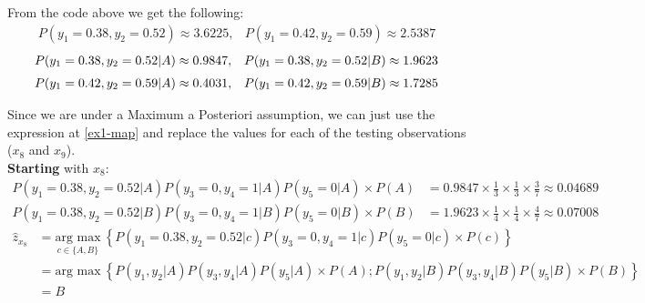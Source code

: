 \documentclass[12pt]{article}
\begin{document}
\begin{enumerate}[leftmargin=\labelsep]
\begin{enumerate}
                

                From the code above we get the following:
                \[
                  \begin{array}{cc}
                    P(y_1 = 0.38, y_2 = 0.52) \approx 3.6225, &
                    P(y_1 = 0.42, y_2 = 0.59) \approx 2.5387
                  \end{array}
                \]
                \[
                  \begin{array}{cc}
                    P(y_1 = 0.38, y_2 = 0.52 | A) \approx 0.9847, &
                    P(y_1 = 0.38, y_2 = 0.52 | B) \approx 1.9623    \\[\medskipamount]
                    P(y_1 = 0.42, y_2 = 0.59 | A) \approx 0.4031, &
                    P(y_1 = 0.42, y_2 = 0.59 | B) \approx 1.7285
                  \end{array}
                \]

                Since we are under a Maximum a Posteriori assumption, we can just use the expression at \eqref{ex1-map}
                and replace the values for each of the testing observations ($x_8$ and $x_9$).\\
                \textbf{Starting} with $x_8$:
                $$
                  \begin{aligned}
                    P(y_1 = 0.38, y_2 = 0.52 | A) P(y_3 = 0, y_4 = 1 | A) P(y_5 = 0 | A) \times P(A) & = 0.9847 \times \frac{1}{3} \times \frac{1}{3} \times \frac{3}{7} \approx 0.04689 \\
                    P(y_1 = 0.38, y_2 = 0.52 | B) P(y_3 = 0, y_4 = 1 | B) P(y_5 = 0 | B) \times P(B) & = 1.9623 \times \frac{1}{4} \times \frac{1}{4} \times \frac{4}{7} \approx 0.07008
                  \end{aligned}
                $$
                $$
                  \begin{aligned}
                    \hat{z}_{x_8} & = \underset{c \in \{A, B\}}{\text{arg max}} \medspace \left\{P(y_1 = 0.38, y_2 = 0.52 | c) P(y_3 = 0, y_4 = 1 | c) P(y_5 = 0 | c) \times P(c)\right\}    \\
                                  & = \text{arg max} \medspace \left\{P(y_1, y_2 | A) P(y_3, y_4 | A) P(y_5 | A) \times P(A); P(y_1, y_2 | B) P(y_3, y_4 | B) P(y_5 | B) \times P(B)\right\} \\
                                  & = B
                  \end{aligned}
                $$


\end{enumerate}
\end{enumerate}
\end{document}
